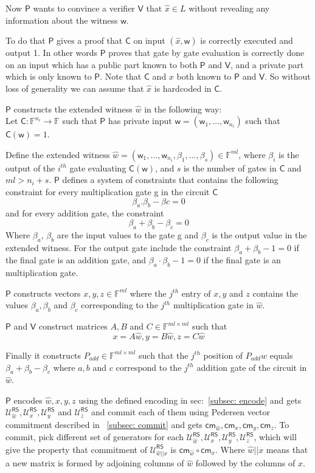 \documentclass[runningheads]{llncs}
\def\prover{\mathsf{P}}
\def\verifier{\mathsf{V}}
\def\RS{\mathsf{RS}} %
\def\cm{\mathsf{cm}} %
\def\C{\mathsf{C}} %
\def\wit{\mathsf{w}} %
\def\extwit{\hat{w}} %
\def\stmt{\hat{x}} %
\def\oracle{\mathcal{U}^{\RS}}
\def\bbF{\mathbb{F}}
\begin{document}
	Now $\prover$ wants to convince a verifier $\verifier$ that $\stmt\in L$ without revealing any information about the witness $\wit$. 
	
	To do that $\prover$ gives a proof that $\C$ on input $(\stmt, \wit)$ is correctly executed and output 1. In other words $\prover$ proves that gate by gate evaluation is correctly done on an input which has a public part known to both $\prover$ and $\verifier$, and a private part which is only known to $\prover$. 
	Note that $\C$ and $x$ both known to $\prover$ and $\verifier$. So without loss of generality we can assume that $\stmt$ is hardcoded in $\C$.
	
	$\prover$ constructs the extended witness $\extwit$ in the following way: \\
	Let $\C:\bbF^{n_i}\rightarrow \bbF$ such that $\prover$ has private input $\wit = (\wit_1,\ldots, \wit_{n_i})$ such that $\C(\wit)=1$.
	
	Define the extended witness $\extwit = (\wit_1,\ldots,\wit_{n_i}, \beta_1,\ldots, \beta_s) \in \bbF^{ml}$, where $\beta_i$ is the output of the $i^{th}$ gate evaluating $\C(\wit)$, and $s$ is the number of gates in $\C$ and $ml>n_i + s$. $\prover$ defines a system of constraints that contains the following constraint for every multiplication gate g in the circuit $\C$ $$\beta_{a}.\beta_{b}-\beta{c}=0$$
	and for every addition gate, the constraint 
	$$\beta_a + \beta_b - \beta_c = 0$$
	Where $\beta_a$, $\beta_b$ are the input values to the gate g and $\beta_c$ is the output value in the extended witness. For the output gate include the constraint $\beta_a + \beta_b - 1 = 0$ if the final gate is an addition gate, and $\beta_a\cdot \beta_b - 1 = 0$ if the final gate is an multiplication gate. 
	
	$\prover$ constructs vectors $x,y,z \in \bbF^{ml}$ where the $j^{th}$ entry of $x,y$ and $z$ contains the values $\beta_a, \beta_b$ and $\beta_c$ corresponding to the $j^{th}$ multiplication gate in $\extwit$.
	
	$\prover$ and $\verifier$ construct matrices $A, B$ and $C \in \bbF^{ml \times ml}$ such that 
	$$x = A \extwit, y= B \extwit, z= C \extwit$$
	
	Finally it constructs $P_{add} \in \bbF^{ml \times ml}$ such that the $j^{th}$ position of $P_{add} \extwit$ equals $\beta_a + \beta_b - \beta_c$ where $a, b$ and $c$ correspond to the $j^{th}$ addition gate of the circuit in $\extwit$.
	
	$\prover$ encodes $\extwit , x, y , z$ using the defined encoding in sec:~\ref{subsec: encode} and gets $\oracle_{\extwit}, \oracle_x, \oracle_y$ and $\oracle_z$ and commit each of them using Pedersen vector commitment described in ~\ref{subsec: commit} and gets $\cm_{\extwit}, \cm_x, \cm_y, \cm_z$. To commit, pick different set of generators for each $\oracle_{\extwit}, \oracle_x, \oracle_y, \oracle_z$, which will give the property that commitment of $\oracle_{\extwit||x}$ is $\cm_{\extwit} \circ \cm_x$. Where $\extwit||x$ means that a new matrix is formed by adjoining columns of $\extwit$ followed by the columns of $x$. 
	
\end{document}
